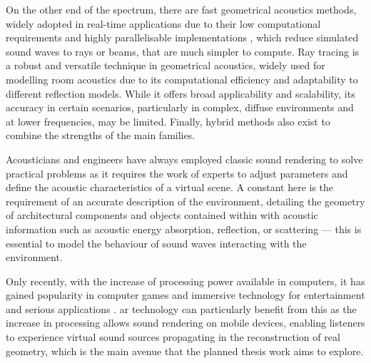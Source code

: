 On the other end of the spectrum, there are fast geometrical acoustics methods, widely adopted in real-time applications due to their low computational requirements and highly parallelisable implementations \citep{cowan2010gpu}, which reduce simulated sound waves to rays or beams, that are much simpler to compute. Ray tracing is a robust and versatile technique in geometrical acoustics, widely used for modelling room acoustics due to its computational efficiency and adaptability to different reflection models. While it offers broad applicability and scalability, its accuracy in certain scenarios, particularly in complex, diffuse environments and at lower frequencies, may be limited. Finally, hybrid methods also exist to combine the strengths of the main families.\par
Acousticians and engineers have always employed classic sound rendering to solve practical problems as it requires the work of experts to adjust parameters and define the acoustic characteristics of a virtual scene. A constant here is the requirement of an accurate description of the environment, detailing the geometry of architectural components and objects contained within with acoustic information such as acoustic energy absorption, reflection, or scattering --- this is essential to model the behaviour of sound waves interacting with the environment. \par
Only recently, with the increase of processing power available in computers, it has gained popularity in computer games and immersive technology for entertainment and serious applications \citep{zhang18}. \acrshort{ar} technology can particularly benefit from this as the increase in processing allows sound rendering on mobile devices, enabling listeners to experience virtual sound sources propagating in the reconstruction of real geometry, which is the main avenue that the planned thesis work aims to explore.\par


